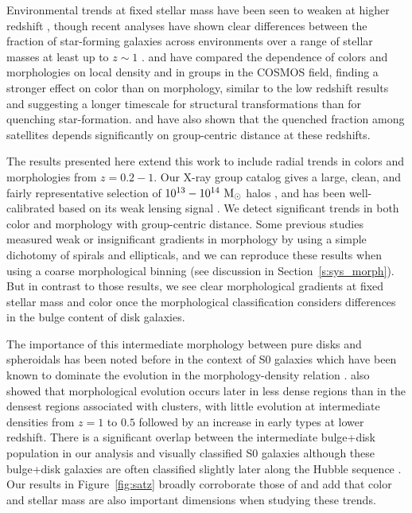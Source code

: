 \documentclass[12pt]{emulateapj}
\begin{document}
Environmental trends at fixed stellar mass have been seen to weaken at
higher redshift \citep[e.g.,][]{Poggianti2008, Tasca2009,
  Cucciati2010, Iovino2010, Kovac2010b}, though recent analyses have
shown clear differences between the fraction of star-forming galaxies
across environments over a range of stellar masses at least up to $z\sim1$
\citep{Cooper2010, Peng2010, George2011, Knobel2012}. \citet{Tasca2009} and
\citet{Kovac2010b} have compared the dependence of colors and
morphologies on local density and in groups in the COSMOS field,
finding a stronger effect on color than on morphology, similar to the
low redshift results and suggesting a longer timescale for structural
transformations than for quenching star-formation. \citet{Muzzin2012}
and \citet{Presotto2012} have also shown that the quenched fraction
among satellites depends significantly on group-centric distance at
these redshifts.


The results presented here extend this work to include radial trends
in colors and morphologies from $z=0.2-1$. Our X-ray group catalog
gives a large, clean, and fairly representative selection of
$10^{13}-10^{14}~{\rm M_{\odot}}$ halos \citep{Finoguenov2010}, and
has been well-calibrated based on 
its weak lensing signal \citep{Leauthaud2010, George2012}. We detect significant
trends in both color and morphology with group-centric distance. Some previous studies measured weak or insignificant
gradients in morphology by using a simple dichotomy of spirals and
ellipticals, and we can reproduce these results when using a coarse
morphological binning (see discussion in Section~\ref{s:sys_morph}). But in contrast
to those results, we see clear morphological gradients at
fixed stellar mass and color once the morphological classification
considers differences in the bulge content of disk galaxies.

The importance of this intermediate morphology between pure disks and
spheroidals has been noted before in the context of S0 galaxies which
have been known to dominate the evolution in the morphology-density
relation \citep{Dressler1997, Postman2005, Smith2005a, Boselli2006b,
  Moran2007, Oesch2010, Lackner2013}.
\citet{Smith2005a} also showed that morphological evolution occurs
later in less dense regions than in the densest regions associated
with clusters, with little evolution at intermediate densities from
$z=1$ to $0.5$ followed by an increase in early types at lower
redshift. There is a significant overlap between the intermediate
bulge+disk population in our analysis and visually classified S0
galaxies although these bulge+disk galaxies are often classified
slightly later along the Hubble sequence \citep{Scarlata2007}. Our
results in Figure~\ref{fig:satz} broadly corroborate those of
\citet{Smith2005a} and add that color and stellar mass are also
important dimensions when studying these trends.
\end{document}
